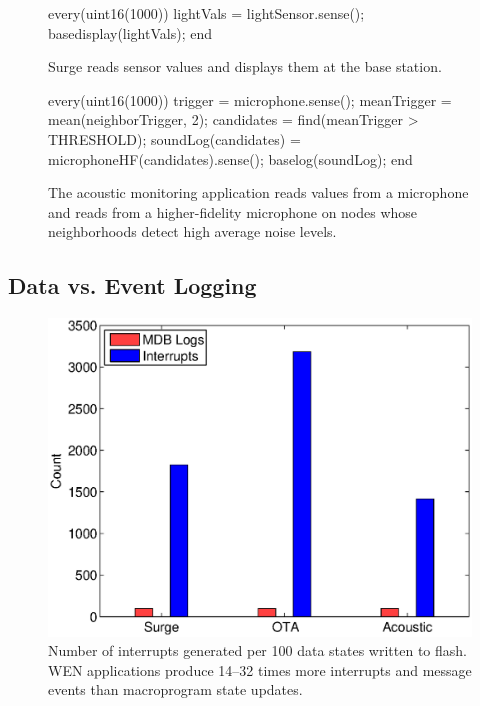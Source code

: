 \begin{figure}[t]
\begin{macrolab}
every(uint16(1000))
 lightVals = lightSensor.sense();
 basedisplay(lightVals);
end
\end{macrolab}
\caption[The macroprogram for Surge]{Surge reads sensor values and displays them
at the base station.}
\label{code:surge}
\end{figure}

\begin{figure}[t]
\begin{macrolab}
every(uint16(1000))
 trigger = microphone.sense();
 meanTrigger = mean(neighborTrigger, 2);
 candidates = find(meanTrigger > THRESHOLD);
 soundLog(candidates) = microphoneHF(candidates).sense();
 baselog(soundLog);
end
\end{macrolab}
\caption[The macroprogram for acoustic monitoring]{The acoustic monitoring
application reads values from a microphone and reads from a higher-fidelity
microphone on nodes whose neighborhoods detect high average noise levels.}
\label{code:acoustic}
\end{figure}

\subsection{Data vs. Event Logging} \label{dataEvent}

\begin{figure}[t]
  \centering
  \includegraphics[scale=0.75]{fig/interruptvsMLLogger}
  \caption[Number of interrupts generated per 100 data states written to
  flash]{Number of interrupts generated per 100 data states written to
  flash. WEN applications produce 14--32 times more interrupts and message
  events than macroprogram state updates.}
  \label{fig:interruptvsMLLogger}
\end{figure}

